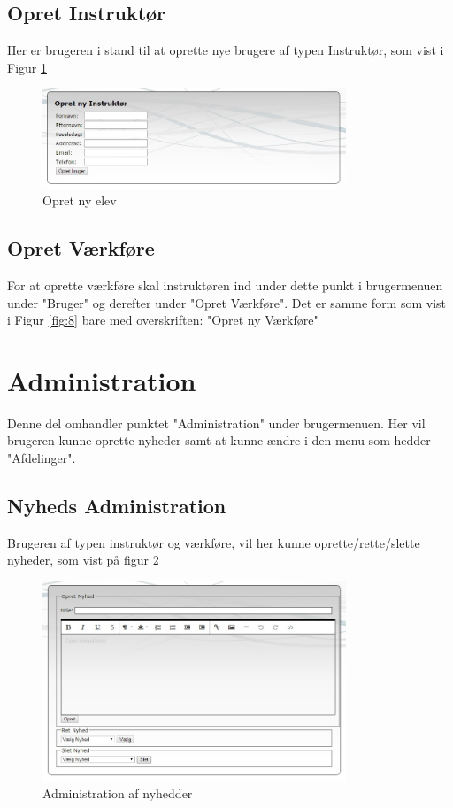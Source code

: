 \documentclass{article}
\begin{document}
\subsection*{Opret Instruktør}
Her er brugeren i stand til at oprette nye brugere af typen Instruktør, som vist i Figur \ref{fig:9}
\begin{figure}[ht]
\includegraphics[width=343px]{inst.jpg}
\caption{Opret ny elev}
\label{fig:9}
\end{figure}

\subsection*{Opret Værkføre}
For at oprette værkføre skal instruktøren ind under dette punkt i brugermenuen under "Bruger" og derefter under "Opret Værkføre". Det er samme form som vist i Figur \ref{fig:8} bare med overskriften: "Opret ny Værkføre"
\newpage
\section{Administration}
Denne del omhandler punktet "Administration" under brugermenuen. Her vil brugeren kunne oprette nyheder samt at kunne ændre i den menu som hedder "Afdelinger".
\subsection*{Nyheds Administration}
Brugeren af typen instruktør og værkføre, vil her kunne oprette/rette/slette nyheder, som vist på figur \ref{fig:10}
\begin{figure}[ht]
\includegraphics[width=343px]{nyhedadmin.jpg}
\caption{Administration af nyhedder}
\label{fig:10}
\end{figure}
\newpage
\end{document}
